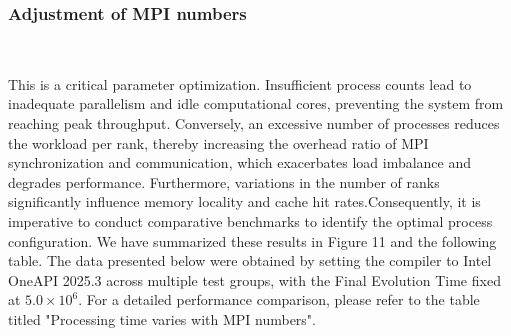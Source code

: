 \subsubsection{Adjustment of MPI numbers}
\ 

This is a critical parameter optimization. Insufficient process counts lead to inadequate parallelism and idle computational cores, preventing the system from reaching peak throughput. Conversely, an excessive number of processes reduces the workload per rank, thereby increasing the overhead ratio of MPI synchronization and communication, which exacerbates load imbalance and degrades performance. Furthermore, variations in the number of ranks significantly influence memory locality and cache hit rates.Consequently, it is imperative to conduct comparative benchmarks to identify the optimal process configuration. We have summarized these results in Figure 11 and the following table. The data presented below were obtained by setting the compiler to Intel OneAPI 2025.3 across multiple test groups, with the Final Evolution Time fixed at $5.0 \times 10^6$. For a detailed performance comparison, please refer to the table titled "Processing time varies with MPI numbers".
